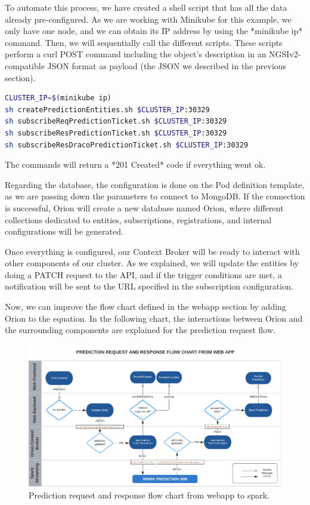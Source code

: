 To automate this process, we have created a shell script that has all the data already pre-configured. As we are working with Minikube for this example, we only have one node, and we can obtain its IP address by using the *minikube ip* command. Then, we will sequentially call the different scripts. These scripts perform a curl POST command including the object's description in an NGSIv2-compatible JSON format as payload (the JSON we described in the previous section).

\begin{lstlisting}[language=bash,caption=Script to perform the configuration of Orion entities and Subscriptions]
CLUSTER_IP=$(minikube ip)
sh createPredictionEntities.sh $CLUSTER_IP:30329
sh subscribeReqPredictionTicket.sh $CLUSTER_IP:30329
sh subscribeResPredictionTicket.sh $CLUSTER_IP:30329
sh subscribeResDracoPredictionTicket.sh $CLUSTER_IP:30329
\end{lstlisting}

The commands will return a *201 Created* code if everything went ok.

Regarding the database, the configuration is done on the Pod definition template, as we are passing down the parameters to connect to MongoDB. If the connection is successful, Orion will create a new database named Orion, where different collections dedicated to entities, subscriptions, registrations, and internal configurations will be generated.

Once everything is configured, our Context Broker will be ready to interact with other components of our cluster. As we explained, we will update the entities by doing a PATCH request to the API, and if the trigger conditions are met, a notification will be sent to the URL specified in the subscription configuration.

Now, we can improve the flow chart defined in the webapp section by adding Orion to the equation. In the following chart, the interactions between Orion and the surrounding components are explained for the prediction request flow.

\begin{figure}[H]
	\centering
	\includegraphics[width=1\linewidth]{imagenes/flow-chart-web-spark.png}
	\caption{Prediction request and response flow chart from webapp to spark.}
	\label{flow-chart-web-spark}
\end{figure}

